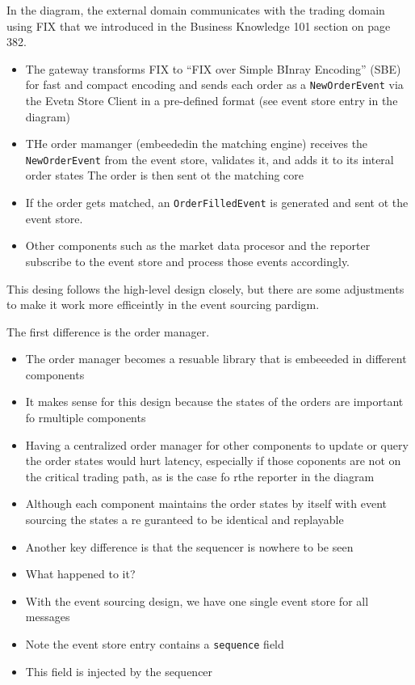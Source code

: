 \documentclass{report}
\theoremstyle{definition}
\begin{document}
In the diagram, the external domain communicates with the trading domain using FIX that we introduced in the Business Knowledge 101 section on page 382.

\begin{itemize}
\item
The gateway transforms FIX to ``FIX over Simple BInray Encoding'' (SBE) for fast and compact encoding and sends each order as a \lstinline|NewOrderEvent| via the Evetn Store Client in a pre-defined format (see event store entry in the diagram)
\item
THe order mamanger (embeededin the matching engine) receives the \lstinline|NewOrderEvent| from the event store, validates it, and adds it to its interal order states The order is then sent ot the matching core
\item
If the order gets matched, an \lstinline|OrderFilledEvent| is generated and sent ot the event store.
\item
Other components such as the market data procesor and the reporter subscribe to the event store and process those events accordingly.
\end{itemize}

This desing follows the high-level design closely, but there are some adjustments to make it work more efficeintly in the event sourcing pardigm.

The first difference is the order manager.

\begin{itemize}
\item
The order manager becomes a resuable library that is embeeeded in different components
\item
It makes sense for this design because the states of the orders are important fo rmultiple components
\item
Having a centralized order manager for other components to update or query the order states would hurt latency, especially if those coponents are not on the critical trading path, as is the case fo rthe reporter in the diagram
\item
Although each component maintains the order states by itself with event sourcing the states a re guranteed to be identical and replayable
\item
Another key difference is that the sequencer is nowhere to be seen
\item
What happened to it?
\item
With the event sourcing design, we have one single event store for all messages
\item
Note the event  store entry contains a \lstinline|sequence| field
\item
This field is injected by the sequencer
\end{itemize}
\end{document}
